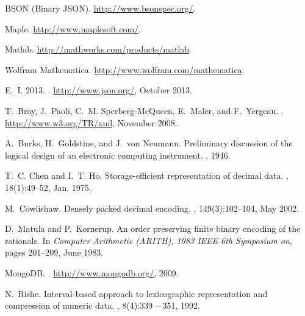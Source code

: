 \documentclass{acm_proc_article-sp}
\begin{document}

\begin{thebibliography}{10}

{{BSON (Binary JSON)}}.
\newblock \url{http://www.bsonspec.org/}.

Maple.
\newblock \url{http://www.maplesoft.com/}.

Matlab.
\newblock \url{http://mathworks.com/products/matlab}.

{{Wolfram Mathematica}}.
\newblock \url{http://www.wolfram.com/mathematica}.

E.~I. 2013.
.
\newblock \url{http://www.json.org/}, October 2013.

T.~Bray, J.~Paoli, C.~M. Sperberg-McQueen, E.~Maler, and F.~Yergeau.
.
\newblock \url{http://www.w3.org/TR/xml}, November 2008.

A.~Burks, H.~Goldstine, and J.~von Neumann.
\newblock Preliminary discussion of the logical design of an electronic
  computing instrument.
, 1946.

T.~C. Chen and I.~T. Ho.
\newblock Storage-efficient representation of decimal data.
, 18(1):49--52, Jan. 1975.

M.~Cowlishaw.
\newblock Densely packed decimal encoding.
,
  149(3):102--104, May 2002.

D.~Matula and P.~Kornerup.
\newblock An order preserving finite binary encoding of the rationals.
\newblock In {\em Computer Arithmetic (ARITH), 1983 IEEE 6th Symposium on},
  pages 201--209, June 1983.

MongoDB.
.
\newblock \url{http://www.mongodb.org/}, 2009.

N.~Rishe.
\newblock Interval-based approach to lexicographic representation and
  compression of numeric data.
, 8(4):339 -- 351, 1992.

\end{thebibliography}
\end{document}
